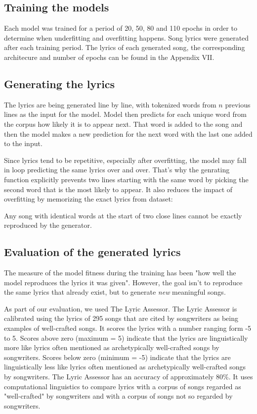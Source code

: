 \documentclass[conference]{IEEEtran}
\begin{document}
\subsection{Training the models}
Each model was trained for a period of 20, 50, 80 and 110 epochs in order to determine when underfitting and overfitting happens. 
Song lyrics were generated after each training period.
The lyrics of each generated song, the corresponding architecure and number of epochs can be found in the Appendix VII.

\subsection{Generating the lyrics}
The lyrics are being generated line by line, with tokenized words from $n$
previous lines as the input for the model. Model then predicts for each unique
word from the corpus how likely it is to appear next. That word is added to
the song and then the model makes a new prediction for the next word with the
last one added to the input.

Since lyrics tend to be repetitive, especially after overfitting, the model may
fall in loop predicting the same lyrics over and over. That's why the
genrating function explicitly prevents two lines starting with the same word
by picking the second word that is the most likely to appear. It also reduces
the impact of overfitting by memorizing the exact lyrics from dataset:

Any song with identical words at the start of two close lines cannot be exactly
reproduced by the generator.

\subsection{Evaluation of the generated lyrics}
The measure of the model fitness during the training has been "how well the
model reproduces the lyrics it was given". However, the goal isn't to reproduce
the same lyrics that already exist, but to generate \textit{new} meaningful songs. 

As part of our evaluation, we used The Lyric Assessor.
The Lyric Assessor is calibrated using the lyrics of 295 songs that are cited by songwriters as being examples of well-crafted songs. It scores the lyrics with a number ranging form -5 to 5. 
Scores above zero (maximum = 5) indicate that the lyrics are linguistically more like lyrics often mentioned as archetypically well-crafted songs by songwriters.
Scores below zero (minimum = -5) indicate that the lyrics are linguistically less like lyrics often mentioned as archetypically well-crafted songs by songwriters.
The Lyric Assessor has an accuracy of approximately 80\%. It uses computational linguistics to compare lyrics with a corpus of songs regarded as "well-crafted" by songwriters and with a corpus of songs not so regarded by songwriters.
\end{document}
